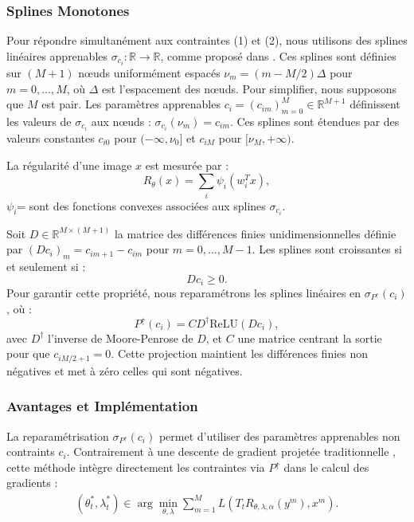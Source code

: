 \documentclass[a4paper, 12pt]{report} %
\begin{document}
\subsubsection{Splines Monotones}

Pour répondre simultanément aux contraintes (1) et (2), nous utilisons des splines linéaires apprenables \( \sigma_{c_i} : \mathbb{R} \to \mathbb{R} \), comme proposé dans \cite{bohra2021learning,bohra2020learning}. Ces splines sont définies sur \( (M + 1) \) nœuds uniformément espacés \( \nu_m = (m - M/2) \Delta \) pour \( m = 0, \ldots, M \), où \( \Delta \) est l’espacement des nœuds. Pour simplifier, nous supposons que \( M \) est pair. Les paramètres apprenables \( c_i = (c_{i m})_{m=0}^M \in \mathbb{R}^{M+1} \) définissent les valeurs de \( \sigma_{c_i} \) aux nœuds : \( \sigma_{c_i}(\nu_m) = c_{i m} \). Ces splines sont étendues par des valeurs constantes \( c_{i 0} \) pour \( (-\infty, \nu_0] \) et \( c_{i M} \) pour \( [\nu_M, +\infty) \).

La régularité d’une image \( x \) est mesurée par :
\[
R_\theta(x) = \sum_{i} \psi_i(w_i^T x),
\]
  \(\psi_i\)= sont des fonctions convexes associées aux splines \(\sigma_{c_i}\).

Soit \( D \in \mathbb{R}^{M \times (M+1)} \) la matrice des différences finies unidimensionnelles définie par \( (D c_i)_m = c_{i m+1} - c_{i m} \) pour \( m = 0, \ldots, M-1 \). Les splines sont croissantes si et seulement si :
\[
D c_i \geq 0.
\]
Pour garantir cette propriété, nous reparamétrons les splines linéaires en \( \sigma_{P^{\uparrow}}(c_i) \), où :
\[
P^{\uparrow}(c_i) = C D^{\dagger} \text{ReLU}(D c_i),
\]
avec \( D^{\dagger} \) l’inverse de Moore-Penrose de \( D \), et \( C \) une matrice centrant la sortie pour que \( c_{i M/2+1} = 0 \). Cette projection maintient les différences finies non négatives et met à zéro celles qui sont négatives.

\subsubsection{Avantages et Implémentation}

La reparamétrisation \( \sigma_{P^{\uparrow}}(c_i) \) permet d’utiliser des paramètres apprenables non contraints \( c_i \). Contrairement à une descente de gradient projetée traditionnelle \cite{kobler2017variational}, cette méthode intègre directement les contraintes via \( P^{\uparrow} \) dans le calcul des gradients :
\[
\begin{aligned}
(\theta^*_t, \lambda^*_t) \in \arg \min_{\theta, \lambda} \sum_{m=1}^M L \left( T_t R_{\theta, \lambda, \alpha}(y^m), x^m \right).
\end{aligned}
\]
\end{document}
